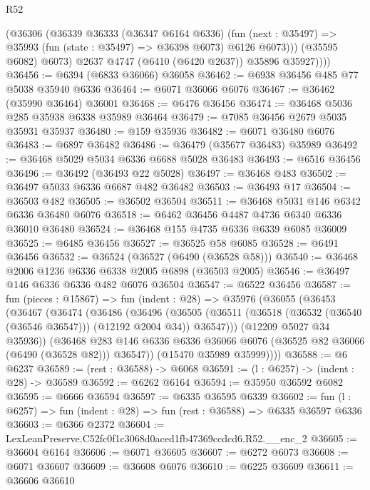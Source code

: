 \begin{lexlean}{R52}
\begin{coremodule}
              (@36306
                (@36339
                  @36333
                  (@36347 @6164 @6336)
                  (fun (next : @35497) =>
                  @35993 (fun (state : @35497) => @36398 @6073) @6126 @6073)))
              (@35595 @6082)
              @6073)
            @2637
            @4747
            (@6410 (@6420 @2637))
            @35896
            @35927))))
@36456 := @6394 (@6833 @36066) @36058
@36462 := @6938 @36456 @485 @77 @5038 @35940 @6336
@36464 := @6071 @36066 @6076
@36467 := @36462 (@35990 @36464) @36001
@36468 := @6476 @36456
@36474 := @36468 @5036 @285 @35938 @6338 @35989 @36464
@36479 := @7085 @36456 @2679 @5035 @35931 @35937
@36480 := @159 @35936
@36482 := @6071 @36480 @6076
@36483 := @6897 @36482
@36486 := @36479 (@35677 @36483) @35989
@36492 := @36468 @5029 @5034 @6336 @6688 @5028 @36483
@36493 := @6516 @36456
@36496 := @36492 (@36493 @22 @5028)
@36497 := @36468 @483
@36502 := @36497 @5033 @6336 @6687 @482 @36482
@36503 := @36493 @17
@36504 := @36503 @482
@36505 := @36502 @36504
@36511 := @36468 @5031 @146 @6342 @6336 @36480 @6076
@36518 := @6462 @36456 @4487 @4736 @6340 @6336 @36010 @36480
@36524 := @36468 @155 @4735 @6336 @6339 @6085 @36009
@36525 := @6485 @36456
@36527 := @36525 @58 @6085
@36528 := @6491 @36456
@36532 := @36524 (@36527 (@6490 (@36528 @58)))
@36540 := @36468 @2006 @1236 @6336 @6338 @2005 @6898 (@36503 @2005)
@36546 := @36497 @146 @6336 @6336 @482 @6076 @36504
@36547 := @6522 @36456
@36587 := fun (pieces : @15867) =>
  fun (indent : @28) =>
  @35976
    (@36055
      (@36453
        (@36467
          (@36474
            (@36486
              (@36496
                (@36505
                  (@36511 (@36518 (@36532 (@36540 (@36546 @36547))) (@12192 @2004 @34)) @36547)))
              (@12209 @5027 @34 @35936))
            (@36468
              @283
              @146
              @6336
              @6336
              @36066
              @6076
              (@36525 @82 @36066 (@6490 (@36528 @82)))
              @36547))
          (@15470 @35989 @35999))))
@36588 := @6 @6237
@36589 := (rest : @36588) -> @6068
@36591 := (l : @6257) -> (indent : @28) -> @36589
@36592 := @6262 @6164
@36594 := @35950 @36592 @6082
@36595 := @6666 @36594
@36597 := @6335 @36595 @6339
@36602 := fun (l : @6257) => fun (indent : @28) => fun (rest : @36588) => @6335 @36597 @6336
@36603 := @6366 @2372
@36604 := LexLeanPreserve.C52fc0f1c3068d0aced1fb47369ccdcd6.R52.__enc_2
@36605 := @36604 @6164
@36606 := @6071 @36605
@36607 := @6272 @6073
@36608 := @6071 @36607
@36609 := @36608 @6076
@36610 := @6225 @36609
@36611 := @36606 @36610

\end{coremodule}
\end{lexlean}
